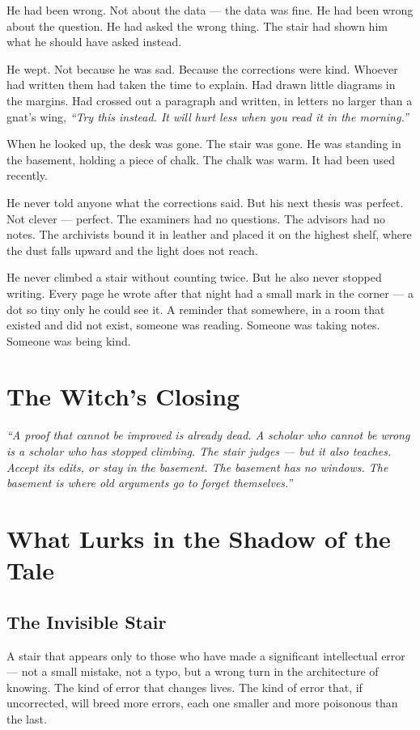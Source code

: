 He had been wrong. Not about the data --- the data was fine. He had been wrong about the question. He had asked the wrong thing. The stair had shown him what he should have asked instead.

He wept. Not because he was sad. Because the corrections were kind. Whoever had written them had taken the time to explain. Had drawn little diagrams in the margins. Had crossed out a paragraph and written, in letters no larger than a gnat's wing, \textit{``Try this instead. It will hurt less when you read it in the morning.''}

When he looked up, the desk was gone. The stair was gone. He was standing in the basement, holding a piece of chalk. The chalk was warm. It had been used recently.

He never told anyone what the corrections said. But his next thesis was perfect. Not clever --- perfect. The examiners had no questions. The advisors had no notes. The archivists bound it in leather and placed it on the highest shelf, where the dust falls upward and the light does not reach.

He never climbed a stair without counting twice. But he also never stopped writing. Every page he wrote after that night had a small mark in the corner --- a dot so tiny only he could see it. A reminder that somewhere, in a room that existed and did not exist, someone was reading. Someone was taking notes. Someone was being kind.

\section*{The Witch's Closing}

\textit{``A proof that cannot be improved is already dead. A scholar who cannot be wrong is a scholar who has stopped climbing. The stair judges --- but it also teaches. Accept its edits, or stay in the basement. The basement has no windows. The basement is where old arguments go to forget themselves.''}

\section*{What Lurks in the Shadow of the Tale}

\subsection*{The Invisible Stair}

A stair that appears only to those who have made a significant intellectual error --- not a small mistake, not a typo, but a wrong turn in the architecture of knowing. The kind of error that changes lives. The kind of error that, if uncorrected, will breed more errors, each one smaller and more poisonous than the last.

